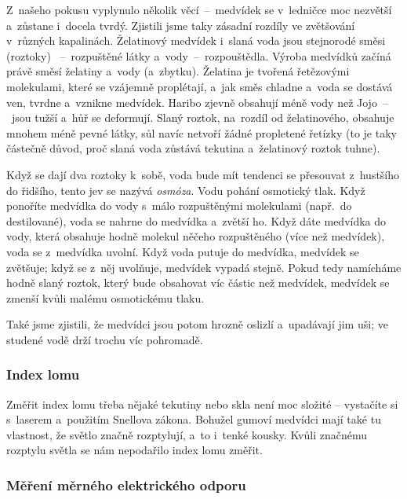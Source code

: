 {Z~našeho pokusu vyplynulo několik věcí~–~medvídek se v~ledničce moc nezvětší 
a~zůstane i~docela tvrdý. Zjistili jsme taky zásadní rozdíly ve zvětšování 
v~různých kapalinách. Želatinový medvídek i~slaná voda jsou stejnorodé směsi
(roztoky) ~--~rozpuštěné látky a~vody~--~rozpouštědla. Výroba medvídků 
začíná právě směsí želatiny a~vody (a~zbytku). Želatina je tvořená řetězovými 
molekulami, které se vzájemně proplétají, a~jak směs chladne a~voda se dostává 
ven, tvrdne a~vznikne medvídek. Haribo zjevně obsahují méně vody než Jojo~–~jsou
tužší a~hůř se deformují. Slaný roztok, na~rozdíl od želatinového, obsahuje 
mnohem méně pevné látky, sůl navíc netvoří žádné propletené řetízky (to je taky 
částečně důvod, proč slaná voda zůstává tekutina a~želatinový roztok tuhne). 
 
\ifyearbook%
\else%
%
\fi


Když se dají dva roztoky k~sobě, voda bude mít tendenci se přesouvat z~hustšího 
do řidšího, tento jev se nazývá \emph{osmóza}. Vodu pohání osmotický tlak. Když ponoříte
 medvídka do vody s~málo rozpuštěnými molekulami (např.~do destilované), voda 
se nahrne do medvídka a~zvětší ho. Když dáte medvídka do vody, která obsahuje 
hodně molekul něčeho rozpuštěného (více než medvídek), voda se z~medvídka uvolní. 
Když voda putuje do medvídka, medvídek se zvětšuje; když se z~něj uvolňuje, medvídek 
vypadá stejně. Pokud tedy namícháme hodně slaný roztok, který bude obsahovat víc 
částic než medvídek, medvídek se zmenší kvůli malému osmotickému tlaku.
 
Také jsme zjistili, že medvídci jsou potom hrozně oslizlí a~upadávají jim uši;
ve studené vodě drží trochu víc pohromadě.
 
 
\subsubsection{Index lomu}
 
Změřit index lomu třeba nějaké tekutiny nebo skla není moc složité – vystačíte si 
s~laserem a~použitím Snellova zákona. Bohužel gumoví medvídci mají také tu vlastnost, 
že světlo značně rozptylují, a~to i~tenké kousky. Kvůli značnému rozptylu světla 
se nám nepodařilo index lomu změřit.
 
\subsubsection{Měření měrného elektrického odporu} 
 
}
